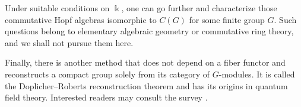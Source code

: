 Under suitable conditions on $\Bbbk$, one can go further and characterize those commutative Hopf algebras isomorphic to $C(G)$ for some finite group $G$. Such questions belong to elementary algebraic geometry or commutative ring theory, and we shall not pursue them here.

Finally, there is another method that does not depend on a fiber functor and reconstructs a compact group solely from its category of $G$-modules. It is called the Doplicher--Roberts reconstruction theorem and has its origins in quantum field theory. Interested readers may consult the survey \cite{Mu07}.
